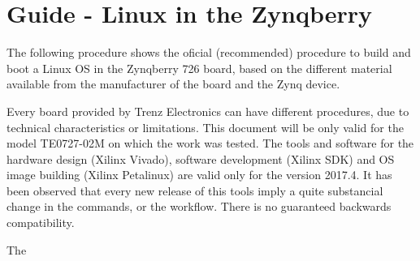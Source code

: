 

\chapter{Guide - Linux in the Zynqberry}

The following procedure shows the oficial (recommended) procedure to build and boot a Linux OS in the Zynqberry 726 board, based on the different material available from the manufacturer of the board and the Zynq device.

Every board provided by Trenz Electronics can have different procedures, due to technical characteristics or limitations. This document will be only valid for the model TE0727-02M on which the work was tested. The tools and software for the hardware design (Xilinx Vivado), software development (Xilinx SDK) and OS image building (Xilinx Petalinux) are valid only for the version 2017.4. It has been observed that every new release of this tools imply a quite substancial change in the commands, or the workflow. There is no guaranteed backwards compatibility.

The 